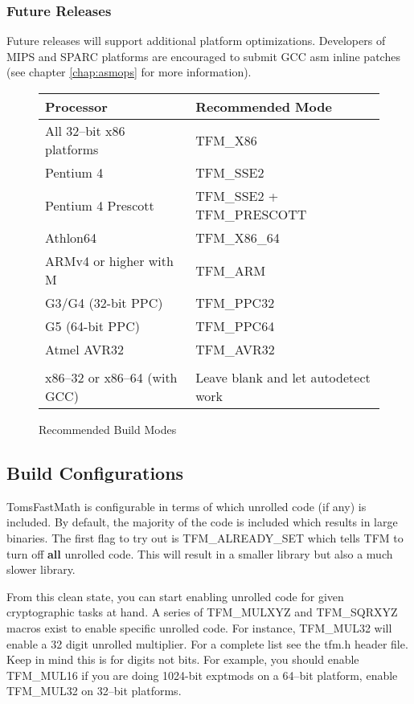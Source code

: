 \documentclass[b5paper]{book}
\begin{document}
\subsubsection{Future Releases}  Future releases will support additional platform optimizations.
Developers of MIPS and SPARC platforms are encouraged to submit GCC asm inline patches 
(see chapter \ref{chap:asmops} for more information).

\begin{figure}[h]
\begin{small}
\begin{center}
\begin{tabular}{|l|l|}
\hline \textbf{Processor} & \textbf{Recommended Mode} \\
\hline All 32--bit x86 platforms  & TFM\_X86 \\
\hline Pentium 4                  & TFM\_SSE2 \\
\hline Pentium 4 Prescott         & TFM\_SSE2 + TFM\_PRESCOTT \\
\hline Athlon64                   & TFM\_X86\_64 \\
\hline ARMv4 or higher with M     & TFM\_ARM \\
\hline G3/G4 (32-bit PPC)         & TFM\_PPC32 \\
\hline G5 (64-bit PPC)            & TFM\_PPC64 \\
\hline Atmel AVR32                & TFM\_AVR32 \\
\hline &\\
\hline x86--32 or x86--64 (with GCC) & Leave blank and let autodetect work \\
\hline
\end{tabular}
\caption{Recommended Build Modes}
\end{center}
\end{small}
\end{figure}

\subsection{Build Configurations}
TomsFastMath is configurable in terms of which unrolled code (if any) is included.  By default, the majority of the code is included which
results in large binaries.  The first flag to try out is TFM\_ALREADY\_SET which tells TFM to turn off \textbf{all} unrolled code.  This will
result in a smaller library but also a much slower library.

From this clean state, you can start enabling unrolled code for given cryptographic tasks at hand.  A series of TFM\_MULXYZ and TFM\_SQRXYZ macros
exist to enable specific unrolled code.  For instance, TFM\_MUL32 will enable a 32 digit unrolled multiplier.  For a complete list see the tfm.h header
file.  Keep in mind this is for digits not bits.  For example, you should enable TFM\_MUL16 if you are doing 1024-bit exptmods on a 64--bit platform, enable
TFM\_MUL32 on 32--bit platforms.
\end{document}

